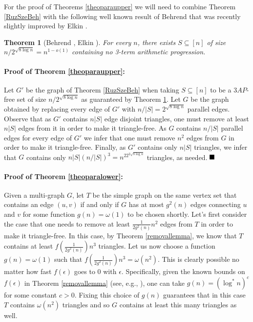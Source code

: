 \documentclass [letterpaper,11pt]{article}
\newtheorem{theo}{Theorem}%
\newcommand{\qed}{\hspace*{\fill} \rule{7pt}{7pt}}
\begin{document}
\bigskip

For the proof of Theorems \ref{theoparaupper}
we will need to combine Theorem \ref{RuzSzeBeh}
with the following well known result of Behrend \cite{B} that was recently slightly improved by Elkin \cite{El}.

\begin{theo}[Behrend \cite{B}, Elkin \cite{El}]\label{Behrend}
For every $n$, there exists $S \subseteq [n]$ of size
$n/2^{\sqrt{8\log n}}=n^{1-o(1)}$ containing no 3-term arithmetic
progression.
\end{theo}

\paragraph{Proof of Theorem \ref{theoparaupper}:} Let
$G'$ be the graph of Theorem \ref{RuzSzeBeh} when taking $S
\subseteq [n]$ to be a $3AP$-free set of size $n/2^{\sqrt{8\log n}}$
as guaranteed by Theorem \ref{Behrend}. Let $G$ be the graph
obtained by replacing every edge of $G'$ with $n/|S|=2^{\sqrt{8\log
n}}$ parallel edges. Observe that as $G'$ contains $n|S|$ edge
disjoint triangles, one must remove at least $n|S|$ edges from it in
order to make it triangle-free. As $G$ contains $n/|S|$ parallel
edges for every edge of $G'$ we infer that one must remove $n^2$
edges from $G$ in order to make it triangle-free. Finally, as $G'$
contains only $n|S|$ triangles, we infer that $G$ contains only
$n|S|(n/|S|)^3=n^22^{2\sqrt{8\log n}}$ triangles, as needed. $\qed$


\paragraph{Proof of Theorem \ref{theoparalower}:} Given a
multi-graph $G$, let $T$ be the simple graph on the same vertex set
that contains an edge $(u,v)$ if and only if $G$ has at most
$g^2(n)$ edges connecting $u$ and $v$ for some function
$g(n)=\omega(1)$ to be chosen shortly. Let's first consider the case
that one needs to remove at least $\frac{1}{2g^2(n)}n^2$ edges from
$T$ in order to make it triangle-free. In this case, by Theorem
\ref{removallemma}, we know that $T$ contains at least
$f(\frac{1}{2g^2(n)})n^3$ triangles. Let us now choose a function
$g(n)=\omega(1)$ such that $f(\frac{1}{2g^2(n)})n^3=\omega(n^2)$.
This is clearly possible no matter how fast $f(\epsilon)$ goes to 0
with $\epsilon$. Specifically, given the known bounds on
$f(\epsilon)$ in Theorem \ref{removallemma} (see, e.g., \cite{KS}),
one can take $g(n)=(\log^*n)^c$ for some constant $c>0$. Fixing this
choice of $g(n)$ guarantees that in this case $T$ contains
$\omega(n^2)$ triangles and so $G$ contains at least this many
triangles as well.
\end{document}
